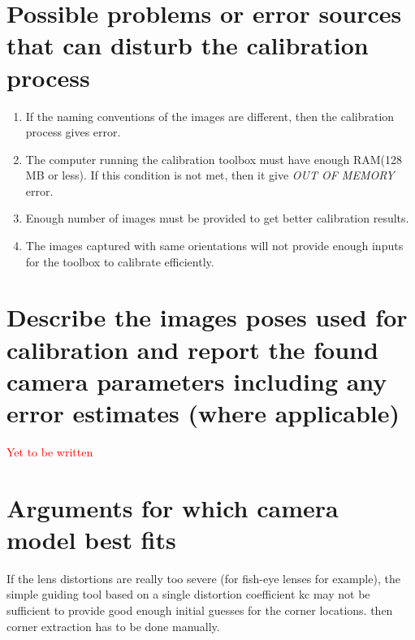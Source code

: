 \documentclass[11pt,a4paper,titlepage]{article}
\begin{document}
\section{Possible problems or error sources that can disturb the calibration process}
\begin{enumerate}
\item If the naming conventions of the images are different, then the calibration process gives error.
\item The computer running the calibration toolbox must have enough RAM(128 MB or less). If this condition is not met, then it give \textit{OUT OF MEMORY} error.
\item Enough number of images must be provided to get better calibration results.
\item The images captured with same orientations will not provide enough inputs for the toolbox to calibrate efficiently.
\end{enumerate}

\section{Describe the images poses used for calibration and report the found camera parameters including any error estimates (where applicable)}

\textcolor{red}{Yet to be written}

\section{Arguments for which camera model best fits} 
	If the lens distortions are really too severe (for fish-eye lenses for example), the simple guiding tool based on a single distortion coefficient kc may not be sufficient to provide good enough initial guesses for the corner locations. then corner extraction has to be done manually.
\end{document}
